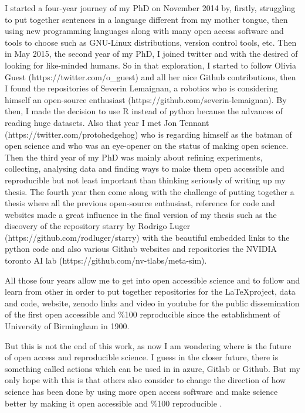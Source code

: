 \documentclass[11pt]{article}
\begin{document}
I started a four-year journey of my PhD on November 2014 
by, firstly, struggling to put together sentences in a language
different from my mother tongue, then using new programming 
languages along with many open access software and tools to choose 
such as GNU-Linux distributions, version control tools, etc. 
Then in May 2015, the second year of my PhD, I joined twitter and
with the desired of looking for like-minded humans. So in that
exploration, I started to follow 
Olivia Guest (https://twitter.com/o\_guest) and all her nice Github contributions, 
then I found the repositories of 
Severin Lemaignan, a robotics who is considering himself
an open-source enthusiast (https://github.com/severin-lemaignan). 
By then, I made the decision to use R instead of python because 
the advances of reading huge datasets. Also that year I met 
Jon Tennant (https://twitter.com/protohedgehog) 
who is regarding himself as the batman of open science
and who was an eye-opener on the status of making open 
science.
Then the third year of my PhD was mainly about refining experiments, 
collecting, analysing data and finding ways to make them open accessible 
and reproducible but not least important than thinking seriously 
of writing up my thesis. 
The fourth year then come along with the challenge of 
putting together a thesis where 
all the previous open-source enthusiast, reference for code and websites 
made a great influence in the final version of my thesis such as 
the discovery of the repository starry 
by Rodrigo Luger (https://github.com/rodluger/starry)
with the beautiful embedded links to the python code
and also various Github websites and repositories the NVIDIA toronto AI lab
(https://github.com/nv-tlabs/meta-sim).




All those four years allow me to get into open accessible science
and to follow and learn from other in order to put together 
repositories for the \LaTeX project, data and code, website, zenodo links 
and video in youtube for the public dissemination of the first
open accessible and \%100 reproducible since the establishment of 
University of Birmingham in 1900.
 
But this is not the end of this work, as now I am wondering 
where is the future of open access and reproducible science.
I guess in the closer future, there is something called actions 
which can be used in
in azure, Gitlab or Github.
But my only hope with this is that others also consider 
to change the direction of how science has been done by 
using more open access software and make science better 
by making it
open accessible and \%100 reproducible 
\citep{xochicale2019-github}.






\end{document}
